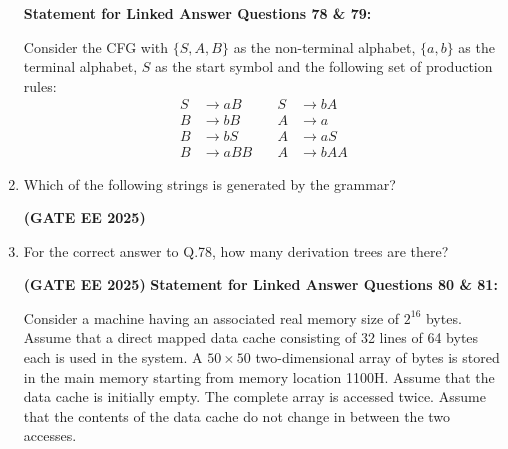 \documentclass[journal,12pt,onecolumn]{IEEEtran}
\theoremstyle{remark}
\begin{document}
\begin{enumerate}
\textbf{Statement for Linked Answer Questions 78 \& 79:}  

Consider the CFG with $\{S, A, B\}$ as the non-terminal alphabet, $\{a, b\}$ as the terminal alphabet, $S$ as the start symbol and the following set of production rules:
\[
\begin{aligned}
S &\to aB \quad &S &\to bA \\
B &\to bB \quad &A &\to a \\
B &\to bS \quad &A &\to aS \\
B &\to aBB \quad &A &\to bAA
\end{aligned}
\]




    
    \item Which of the following strings is generated by the grammar?
    \begin{enumerate}
    \end{enumerate}
\hfill \textbf{(GATE EE 2025)}
    \item For the correct answer to Q.78, how many derivation trees are there?
    \begin{enumerate}
    \end{enumerate}

\hfill \textbf{(GATE EE 2025)}
\newline
\textbf{Statement for Linked Answer Questions 80 \& 81:}  

Consider a machine having an associated real memory size of $2^{16}$ bytes. Assume that a direct mapped data cache consisting of 32 lines of 64 bytes each is used in the system. A $50 \times 50$ two-dimensional array of bytes is stored in the main memory starting from memory location 1100H. Assume that the data cache is initially empty. The complete array is accessed twice. Assume that the contents of the data cache do not change in between the two accesses.



\end{enumerate}
\end{document}
